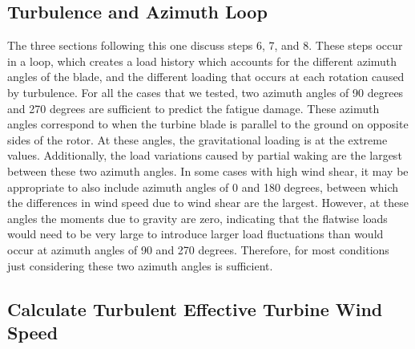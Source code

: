 \documentclass[11pt,letterpaper]{article}
\begin{document}

\subsection{Turbulence and Azimuth Loop}
\label{sec:loop}
The three sections following this one discuss steps 6, 7, and 8. These steps occur in a loop, which creates a load history which accounts for the different azimuth angles of the blade, and the different loading that occurs at each rotation caused by turbulence. 
For all the cases that we tested, two azimuth angles of 90 degrees and 270 degrees are sufficient to predict the fatigue damage. These azimuth angles correspond to when the turbine blade is parallel to the ground on opposite sides of the rotor. At these angles, the gravitational loading is at the extreme values. Additionally, the load variations caused by partial waking are the largest between these two azimuth angles. In some cases with high wind shear, it may be appropriate to also include azimuth angles of 0 and 180 degrees, between which the differences in wind speed due to wind shear are the largest. However, at these angles the moments due to gravity are zero, indicating that the flatwise loads would need to be very large to introduce larger load fluctuations than would occur at azimuth angles of 90 and 270 degrees. Therefore, for most conditions just considering these two azimuth angles is sufficient. %

\subsection{Calculate Turbulent Effective Turbine Wind Speed}
\end{document}
